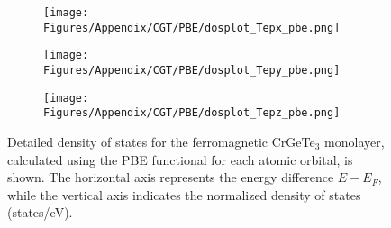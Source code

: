 \begin{figure}[H]
\begin{subfigure}{0.24\textwidth}
    \texttt{[image: Figures/Appendix/CGT/PBE/dosplot\_Tepx\_pbe.png]}
    \label{dosplot_Tepx_pbe}
\end{subfigure}
\hfill
\begin{subfigure}{0.24\textwidth}
    \texttt{[image: Figures/Appendix/CGT/PBE/dosplot\_Tepy\_pbe.png]}
    \label{dosplot_Tepy_pbe}
\end{subfigure}
\begin{subfigure}{0.24\textwidth}
    \texttt{[image: Figures/Appendix/CGT/PBE/dosplot\_Tepz\_pbe.png]}
    \label{dosplot_Tepz_pbe}
\end{subfigure}
\hfill
\caption{Detailed density of states for the ferromagnetic CrGeTe$_3$ monolayer, calculated using the PBE functional for each atomic orbital, is shown. The horizontal axis represents the energy difference $E - E_F$, while the vertical axis indicates the normalized density of states (states/eV).}
\label{Crpbe}
\end{figure}


